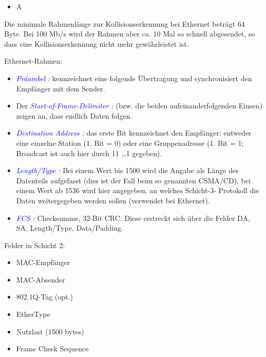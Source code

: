 \begin{itemize}
    \item  \todo A
\end{itemize}

Die minimale Rahmenlänge zur Kollisionserkennung bei Ethernet beträgt 64 Byte. Bei 100 Mb/s wird der Rahmen aber ca. 10 Mal so schnell abgesendet, so dass eine Kollisionserkennung nicht mehr gewährleistet ist.

Ethernet-Rahmen:
\begin{itemize}
    \item \textcolor{blue}{\textit{Präambel :}} kennzeichnet eine folgende Übertragung und synchronisiert den Empfänger mit dem Sender.
    \item Der \textcolor{blue}{\textit{Start-of-Frame-Delimiter :}} (bzw. die beiden aufeinanderfolgenden Einsen) zeigen an, dass endlich Daten folgen.
    \item \textcolor{blue}{\textit{Destination Address :}} das erste Bit kennzeichnet den Empfänger: entweder eine einzelne Station (1. Bit = 0) oder eine Gruppenadresse (1. Bit = 1; Broadcast ist auch hier durch 11 \ldots 1 gegeben).
    \item \textcolor{blue}{\textit{Length/Type :}} Bei einem Wert bis 1500 wird die Angabe als Länge des Datenteils aufgefasst (dies ist der Fall beim so genannten CSMA/CD), bei einem Wert ab 1536 wird hier angegeben, an welches Schicht-3- Protokoll die Daten weitergegeben werden sollen (verwendet bei Ethernet).
    \item \textcolor{blue}{\textit{FCS :}} Checksumme, 32-Bit CRC. Diese erstreckt sich über die Felder DA, SA, Length/Type, Data/Padding.
\end{itemize}
Felder in Schicht 2:
\begin{itemize}
    \item MAC-Empfänger
    \item MAC-Absender
    \item 802.1Q-Tag (opt.)
    \item EtherType
    \item Nutzlast (1500 bytes)
    \item Frame Check Sequence
\end{itemize}

